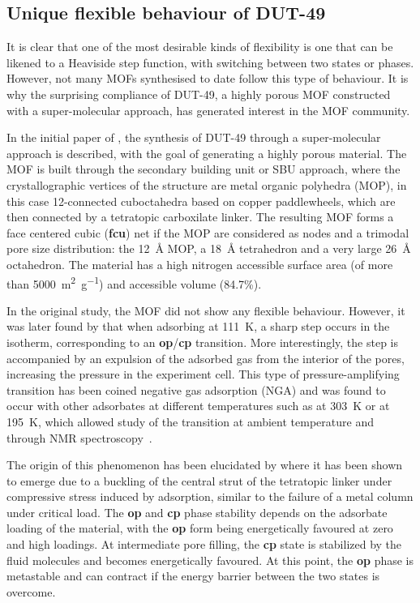\subsection{Unique flexible behaviour of DUT-49}

It is clear that one of the most desirable kinds of flexibility
is one that can be likened to a Heaviside step function, 
with switching between two states or phases. However, not many
MOFs synthesised to date follow this type of behaviour.
It is why the surprising compliance of DUT-49, a highly porous 
MOF constructed with a super-molecular approach, has generated
interest in the MOF community.

In the initial paper of \citet{stoeckHighlyPorousMetal2012}, the 
synthesis of DUT-49 through a super-molecular approach is 
described, with the goal of generating a highly porous material. 
The MOF is built through the secondary building unit or SBU 
approach, where the crystallographic vertices of the structure are 
metal organic polyhedra (MOP), in this case 12-connected cuboctahedra
based on copper paddlewheels, which are then connected by a tetratopic
carboxilate linker. The resulting MOF forms a face centered cubic 
(\textbf{fcu}) net if the MOP are considered as nodes and a trimodal 
pore size distribution: the \SI{12}{\angstrom} MOP, a \SI{18}{\angstrom}
tetrahedron and a very large \SI{26}{\angstrom} octahedron.
The material has a high nitrogen accessible surface area (of more
than \SI{5000}{\metre^2\per\gram}) and accessible volume (84.7\%).

In the original study, the MOF did not show any flexible behaviour.
However, it was later found by 
\citet{krausePressureamplifyingFrameworkMaterial2016} that 
when adsorbing  at \SI{111}{\kelvin}, a sharp step occurs
in the isotherm, corresponding to an \textbf{op}/\textbf{cp} transition. 
More interestingly, the step is accompanied by an expulsion of the
adsorbed gas from the interior of the pores, increasing the pressure
in the experiment cell. This type of pressure-amplifying transition
has been coined negative gas adsorption (NGA) and was found to 
occur with other adsorbates at different temperatures such as  
at \SI{303}{\kelvin} or  at \SI{195}{\kelvin}, which allowed
study of the transition at ambient temperature and through 
 NMR spectroscopy~\cite{schaberSituMonitoringUnique2017}.

The origin of this phenomenon has been elucidated by 
\citet{evansOriginsNegativeGas2016} where it has been shown to 
emerge due to a buckling of the central strut of the 
tetratopic linker under compressive stress induced by adsorption,
similar to the failure of a metal column under critical load.
The \textbf{op} and \textbf{cp} phase stability depends on the 
adsorbate loading of the material, with the \textbf{op} form
being energetically favoured at zero and high loadings. 
At intermediate pore filling, the \textbf{cp} state is
stabilized by the fluid molecules and becomes energetically
favoured. At this point, the \textbf{op} phase is
metastable and can contract if the energy barrier between the 
two states is overcome.

